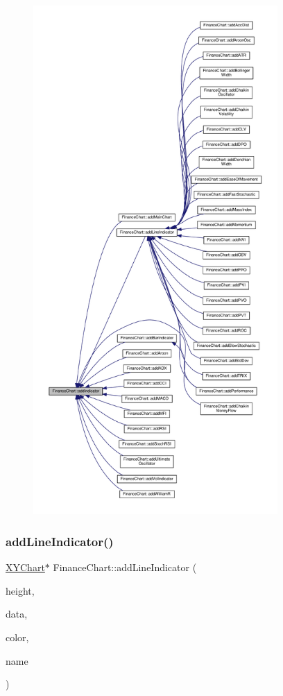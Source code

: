 \begin{figure}[H]
\begin{center}
\leavevmode
\includegraphics[height=550pt]{class_finance_chart_a2e27a54f9787005383604fe1ebac4c58_icgraph}
\end{center}
\end{figure}
\mbox{\label{class_finance_chart_a799daf3775d8e100cd771eba230252ff}} 
\subsubsection{\texorpdfstring{add\+Line\+Indicator()}{addLineIndicator()}}
{\footnotesize\ttfamily \hyperlink{class_x_y_chart}{X\+Y\+Chart}$\ast$ Finance\+Chart\+::add\+Line\+Indicator (\begin{DoxyParamCaption}\item[{int}]{height,  }\item[{\hyperlink{class_double_array}{Double\+Array}}]{data,  }\item[{int}]{color,  }\item[{const char $\ast$}]{name }\end{DoxyParamCaption})\hspace{0.3cm}{\ttfamily [inline]}}



